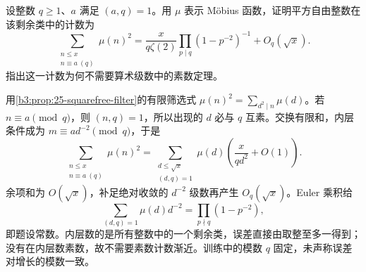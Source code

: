 \begin{exercise}\label{b3:ex:D-8}
设整数 \(q\ge1\)、\(a\) 满足 \((a,q)=1\)。用 \(\mu\) 表示 Möbius 函数，证明平方自由整数在该剩余类中的计数为
\[
 \sum_{\substack{n\le x\\ n\equiv a\ (q)}}\mu(n)^2
 =\frac{x}{q\zeta(2)}\prod_{p\mid q}(1-p^{-2})^{-1}+O_q(\sqrt x).
\]
指出这一计数为何不需要算术级数中的素数定理。
\end{exercise}
\begin{solution}
用\cref{b3:prop:25-squarefree-filter}的有限筛选式
\(\mu(n)^2=\sum_{d^2\mid n}\mu(d)\)。若 \(n\equiv a\pmod q\)，则 \((n,q)=1\)，所以出现的 \(d\) 必与 \(q\) 互素。交换有限和，内层条件成为
\(m\equiv a d^{-2}\pmod q\)，于是
\[
 \sum_{\substack{n\le x\\n\equiv a\ (q)}}\mu(n)^2
 =\sum_{\substack{d\le\sqrt x\\(d,q)=1}}\mu(d)
       \left(\frac{x}{q d^2}+O(1)\right).
\]
余项和为 \(O(\sqrt x)\)，补足绝对收敛的 \(d^{-2}\) 级数再产生 \(O_q(\sqrt x)\)。Euler 乘积给
\[
\sum_{(d,q)=1}\mu(d)d^{-2}=\prod_{p\nmid q}(1-p^{-2}),
\]
即题设常数。内层数的是所有整数中的一个剩余类，误差直接由取整至多一得到；没有在内层数素数，故不需要素数计数渐近。训练中的模数 \(q\) 固定，未声称误差对增长的模数一致。
\end{solution}
